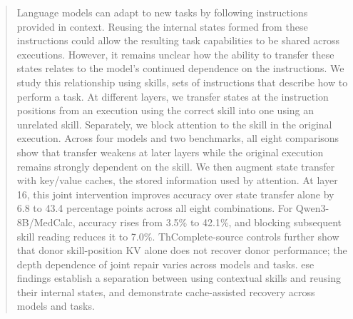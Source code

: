 \begin{abstract}
Language models can adapt to new tasks by following instructions provided in context.
Reusing the internal states formed from these instructions could allow the resulting task capabilities to be shared across executions.
However, it remains unclear how the ability to transfer these states relates to the model’s continued dependence on the instructions.
We study this relationship using skills, sets of instructions that describe how to perform a task.
At different layers, we transfer states at the instruction positions from an execution using the correct skill into one using an unrelated skill.
Separately, we block attention to the skill in the original execution.
Across four models and two benchmarks, all eight comparisons show that transfer weakens at later layers while the original execution remains strongly dependent on the skill.
We then augment state transfer with key/value caches, the stored information used by attention.
At layer 16, this joint intervention improves accuracy over state transfer alone by 6.8 to 43.4 percentage points across all eight combinations.
For Qwen3-8B/MedCalc, accuracy rises from 3.5\% to 42.1\%, and blocking subsequent skill reading reduces it to 7.0\%.
ThComplete-source controls further show that donor skill-position KV alone does not recover donor performance; the depth dependence of joint repair varies across models and tasks.
ese findings establish a separation between using contextual skills and reusing their internal states, and demonstrate cache-assisted recovery across models and tasks.
\end{abstract}
